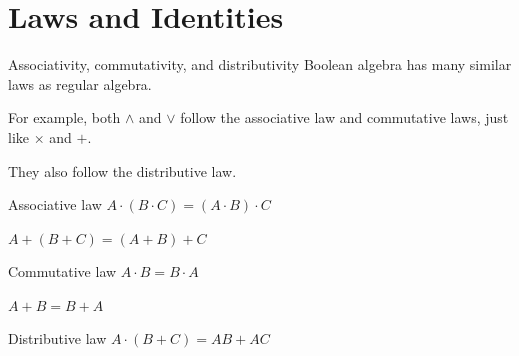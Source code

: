 	\section{Laws and Identities}
	\begin{namedframe}{Associativity, commutativity, and distributivity}
		Boolean algebra has many similar laws as regular algebra.

		For example, both $\wedge$ and $\vee$ follow the associative law and commutative laws, just like $\times$ and $+$.

		They also follow the distributive law.
		\begin{center}
			\pause
			\begin{minipage}{0.45\textwidth}
				\begin{block}{Associative law}
					\centering
					$A \cdot (B \cdot C) = (A \cdot B) \cdot C$

					$A + (B + C) = (A + B) + C$
				\end{block}
			\end{minipage}
			\pause
			\begin{minipage}{0.45\textwidth}
				\begin{block}{Commutative law}
					\centering
					$A \cdot B = B \cdot A$

					$A + B = B + A$
				\end{block}
			\end{minipage}
		\end{center}
		\pause
		\begin{block}{Distributive law}
			\centering
			$A \cdot (B + C) = AB + AC$
		\end{block}
	\end{namedframe}
